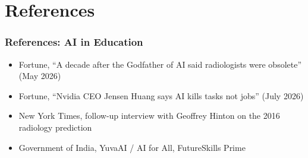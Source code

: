 \section[Refs]{References}

\begin{frame}\frametitle{References: AI in Education}
\small
\begin{itemize}
\item Fortune, ``A decade after the Godfather of AI said radiologists were obsolete'' (May 2026)
\item Fortune, ``Nvidia CEO Jensen Huang says AI kills tasks not jobs'' (July 2026)
\item New York Times, follow-up interview with Geoffrey Hinton on the 2016 radiology prediction
\item Government of India, YuvaAI / AI for All, FutureSkills Prime
\end{itemize}
\end{frame}
